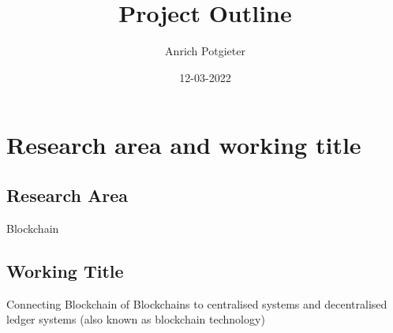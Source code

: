 \documentclass[12pt]{article}
\title{Project Outline}
\author{Anrich Potgieter}
\date{12-03-2022}
\begin{document}
\maketitle
\tableofcontents

\section{Research area and working title}
\subsection{Research Area}
Blockchain

\subsection{Working Title}
Connecting Blockchain of Blockchains to centralised systems and decentralised ledger systems (also known as blockchain technology)
\end{document}
